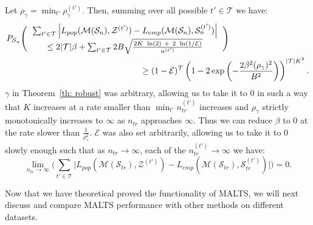Let $\rho_\gamma = \min_{t'} \rho^{(t')}_\gamma$. Then, summing over all possible $t'\in\mathcal{T}$ we have:
\begin{eqnarray*}
     \lefteqn{P_{\mathcal{S}_n}\Bigg(
     \begin{tabular}{c} 
     $\sum_{t'\in\mathcal{T}} \Big| L_{pop}(\mathcal{M}(\mathcal{S}_n),\mathcal{Z}^{(t')}) - L_{emp}(\mathcal{M}(\mathcal{S}_n),\mathcal{S}_n^{(t')}) \Big|$ \\
     $\leq
     2|\mathcal{T}|\beta+ \sum_{t'\in\mathcal{T}} 2B\sqrt{\frac{2K~\ln(2)~+~2~\ln(1/\mathcal{E})}{n^{(t')}}}$
    \end{tabular}
     \Bigg)} \\
     &&\hspace*{150pt}\geq (1-\mathcal{E})^{\mathcal{T}}\left(1-2\exp\left(-\frac{2\beta^2(\rho_\gamma)^2}{B^2}\right)\right)^{|\mathcal{T}|K^2}.
\end{eqnarray*}
$\gamma$ in Theorem~\ref{th: robust} was arbitrary, allowing us to take it to 0 in such a way that $K$ increases at a rate smaller than $\min_{t'} n_{tr}^{(t')}$ increases and $\rho_\gamma$ strictly monotonically increases to $\infty$ as $n_{tr}$ approaches $\infty$. Thus we can reduce $\beta$ to $0$ at the rate slower than $\frac{1}{\rho^2_\gamma}$. $\mathcal{E}$ was also set arbitrarily, allowing us to take it to 0 slowly enough such that as $n_{tr}\to\infty$, each of the $n_{tr} ^{(t')}\to\infty$ we have: 
\begin{equation}
    \lim_{n_{tr}\to\infty} \Bigg( \sum_{t'\in\mathcal{T}} \Big| L_{pop}(\mathcal{M}(\mathcal{S}_{tr}),\mathcal{Z}^{(t')}) - L_{emp}(\mathcal{M}(\mathcal{S}_{tr}),\mathcal{S}^{(t')}_{tr}) \Big| \Bigg) = 0.
\end{equation}

Now that we have theoretical proved the functionality of MALTS, we will next discuss and compare MALTS performance with other methods on different datasets.
